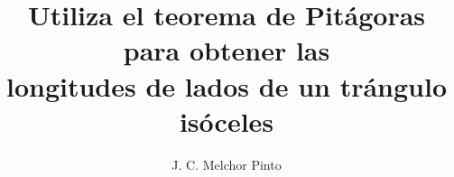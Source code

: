 \documentclass[12pt]{guia}
\title{Utiliza el teorema de Pitágoras para obtener las \\longitudes de lados de un trángulo isóceles}
\author{J. C. Melchor Pinto}
\begin{document}
\pagestyle{headandfoot}
\addpoints
\INFO
\begin{multicols}{2}
    
    
    
    \columnbreak
    
\end{multicols}
\begin{questions}
    \questionboxed[10]{}
    \questionboxed[10]{}
    \questionboxed[10]{}
    \questionboxed[10]{}
    \questionboxed[10]{}
    \questionboxed[10]{}
    \questionboxed[10]{}
    \questionboxed[10]{}
    \questionboxed[10]{}
    \questionboxed[10]{}
    \questionboxed[10]{}
    \questionboxed[10]{}
    \questionboxed[10]{}
    \questionboxed[10]{}
\end{questions}
\end{document}
